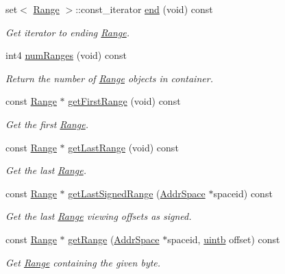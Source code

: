 \begin{DoxyCompactItemize}
set$<$ \mbox{\hyperlink{class_range}{Range}} $>$\+::const\+\_\+iterator \mbox{\hyperlink{class_range_list_aae742ac5298a0d263210366e7aa0bb0b}{end}} (void) const
\begin{DoxyCompactList}\small\item\em Get iterator to ending \mbox{\hyperlink{class_range}{Range}}. \end{DoxyCompactList}\item 
int4 \mbox{\hyperlink{class_range_list_a05df36bbb7206ca0cfb8b5a74fb1fb3d}{num\+Ranges}} (void) const
\begin{DoxyCompactList}\small\item\em Return the number of \mbox{\hyperlink{class_range}{Range}} objects in container. \end{DoxyCompactList}\item 
const \mbox{\hyperlink{class_range}{Range}} $\ast$ \mbox{\hyperlink{class_range_list_aab11ea47a228e2689d18061df238dc6f}{get\+First\+Range}} (void) const
\begin{DoxyCompactList}\small\item\em Get the first \mbox{\hyperlink{class_range}{Range}}. \end{DoxyCompactList}\item 
const \mbox{\hyperlink{class_range}{Range}} $\ast$ \mbox{\hyperlink{class_range_list_a335abcacfeb584ef9684d60adfce11b9}{get\+Last\+Range}} (void) const
\begin{DoxyCompactList}\small\item\em Get the last \mbox{\hyperlink{class_range}{Range}}. \end{DoxyCompactList}\item 
const \mbox{\hyperlink{class_range}{Range}} $\ast$ \mbox{\hyperlink{class_range_list_af9a80345a7c9f95568c00f6f1dbe2673}{get\+Last\+Signed\+Range}} (\mbox{\hyperlink{class_addr_space}{Addr\+Space}} $\ast$spaceid) const
\begin{DoxyCompactList}\small\item\em Get the last \mbox{\hyperlink{class_range}{Range}} viewing offsets as signed. \end{DoxyCompactList}\item 
const \mbox{\hyperlink{class_range}{Range}} $\ast$ \mbox{\hyperlink{class_range_list_aa085a8e737c45ede0bf239e964901802}{get\+Range}} (\mbox{\hyperlink{class_addr_space}{Addr\+Space}} $\ast$spaceid, \mbox{\hyperlink{types_8h_a2db313c5d32a12b01d26ac9b3bca178f}{uintb}} offset) const
\begin{DoxyCompactList}\small\item\em Get \mbox{\hyperlink{class_range}{Range}} containing the given byte. \end{DoxyCompactList}\item 

\end{DoxyCompactItemize}
